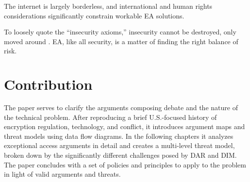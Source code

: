  The internet is largely borderless, and international and human rights
considerations significantly constrain workable \ac{EA} solutions.

 To loosely quote the ``insecurity axioms,'' insecurity cannot be destroyed, only moved
around \cite{nrc_schneider_1999}. \Ac{EA}, like all security, is a matter of finding the right balance of risk.

\eeend


\section{Contribution}
\label{sec-contribution}

The paper serves to clarify the arguments composing debate and the nature of the technical problem. After reproducing a
brief U.S.-focused history of encryption regulation, technology, and conflict, it introduces argument maps and threat
models using data flow diagrams. In the following chapters it analyzes exceptional access arguments in detail and
creates a multi-level threat model, broken down by the significantly different challenges posed by \ac{DAR} and
\ac{DIM}. The paper concludes with a set of policies and principles to apply to the problem in light of valid arguments
and threats.
